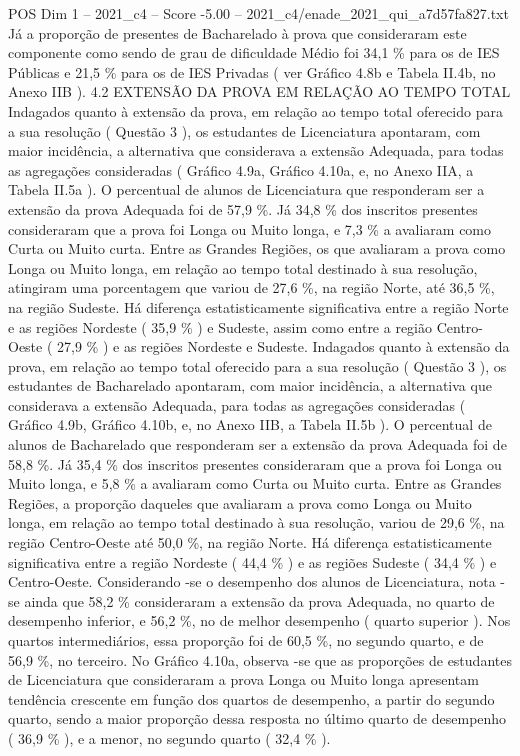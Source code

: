 \begin{textsample}{POS Dim 1 – 2021\_c4 – Score -5.00 – 2021\_c4/enade\_2021\_qui\_a7d57fa827.txt}
Já a proporção de presentes de Bacharelado à prova que consideraram este componente como sendo de grau de dificuldade Médio foi 34,1 \% para os de IES Públicas e 21,5 \% para os de IES Privadas ( ver Gráfico 4.8b e Tabela II.4b, no Anexo IIB ). 4.2 EXTENSÃO DA PROVA EM RELAÇÃO AO TEMPO TOTAL Indagados quanto à extensão da prova, em relação ao tempo total oferecido para a sua resolução ( Questão 3 ), os estudantes de Licenciatura apontaram, com maior incidência, a alternativa que considerava a extensão Adequada, para todas as agregações consideradas ( Gráfico 4.9a, Gráfico 4.10a, e, no Anexo IIA, a Tabela II.5a ).
O percentual de alunos de Licenciatura que responderam ser a extensão da prova Adequada foi de 57,9 \%.
Já 34,8 \% dos inscritos presentes consideraram que a prova foi Longa ou Muito longa, e 7,3 \% a avaliaram como Curta ou Muito curta.
Entre as Grandes Regiões, os que avaliaram a prova como Longa ou Muito longa, em relação ao tempo total destinado à sua resolução, atingiram uma porcentagem que variou de 27,6 \%, na região Norte, até 36,5 \%, na região Sudeste.
Há diferença estatisticamente significativa entre a região Norte e as regiões Nordeste ( 35,9 \% ) e Sudeste, assim como entre a região Centro-Oeste ( 27,9 \% ) e as regiões Nordeste e Sudeste.
Indagados quanto à extensão da prova, em relação ao tempo total oferecido para a sua resolução ( Questão 3 ), os estudantes de Bacharelado apontaram, com maior incidência, a alternativa que considerava a extensão Adequada, para todas as agregações consideradas ( Gráfico 4.9b, Gráfico 4.10b, e, no Anexo IIB, a Tabela II.5b ).
O percentual de alunos de Bacharelado que responderam ser a extensão da prova Adequada foi de 58,8 \%.
Já 35,4 \% dos inscritos presentes consideraram que a prova foi Longa ou Muito longa, e 5,8 \% a avaliaram como Curta ou Muito curta.
Entre as Grandes Regiões, a proporção daqueles que avaliaram a prova como Longa ou Muito longa, em relação ao tempo total destinado à sua resolução, variou de 29,6 \%, na região Centro-Oeste até 50,0 \%, na região Norte.
Há diferença estatisticamente significativa entre a região Nordeste ( 44,4 \% ) e as regiões Sudeste ( 34,4 \% ) e Centro-Oeste.
Considerando -se o desempenho dos alunos de Licenciatura, nota -se ainda que 58,2 \% consideraram a extensão da prova Adequada, no quarto de desempenho inferior, e 56,2 \%, no de melhor desempenho ( quarto superior ).
Nos quartos intermediários, essa proporção foi de 60,5 \%, no segundo quarto, e de 56,9 \%, no terceiro.
No Gráfico 4.10a, observa -se que as proporções de estudantes de Licenciatura que consideraram a prova Longa ou Muito longa apresentam tendência crescente em função dos quartos de desempenho, a partir do segundo quarto, sendo a maior proporção dessa resposta no último quarto de desempenho ( 36,9 \% ), e a menor, no segundo quarto ( 32,4 \% ).

\end{textsample}

